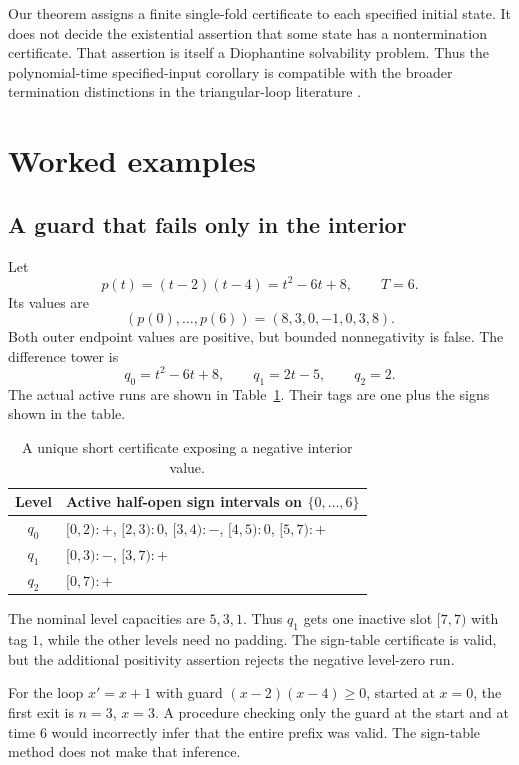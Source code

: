 \documentclass[11pt,a4paper]{article}
\theoremstyle{definition}
\theoremstyle{remark}
\newcommand{\srctag}[1]{\texorpdfstring{\hspace{0.5em}{\normalfont\small\color{accent}[#1]}}{ [#1]}}
\begin{document}
Our theorem assigns a finite single-fold certificate to each specified
initial state. It does not decide the existential assertion that some
state has a nontermination certificate. That assertion is itself a
Diophantine solvability problem. Thus the polynomial-time specified-input
corollary is compatible with the broader termination distinctions in the
triangular-loop literature \cite{hfg2024,lmg2024}.

\section{Worked examples\srctag{02}}
\label{cdc:pt:sec:examples}

\subsection{A guard that fails only in the interior}
Let
\[
 p(t)=(t-2)(t-4)=t^2-6t+8,\qquad T=6.
\]
Its values are
\[
 (p(0),\ldots,p(6))=(8,3,0,-1,0,3,8).
\]
Both outer endpoint values are positive, but bounded nonnegativity is
false. The difference tower is
\[
 q_0=t^2-6t+8,\qquad q_1=2t-5,\qquad q_2=2.
\]
The actual active runs are shown in Table~\ref{cdc:pt:tab:runs}. Their tags are
one plus the signs shown in the table.

\begin{table}[H]
\centering
\begin{tabular}{cl}
\toprule
Level & Active half-open sign intervals on $\{0,\ldots,6\}$\\
\midrule
$q_0$ & $[0,2):+$, $[2,3):0$, $[3,4):-$, $[4,5):0$, $[5,7):+$\\
$q_1$ & $[0,3):-$, $[3,7):+$\\
$q_2$ & $[0,7):+$\\
\bottomrule
\end{tabular}
\caption{A unique short certificate exposing a negative interior value.}
\label{cdc:pt:tab:runs}
\end{table}

The nominal level capacities are $5,3,1$. Thus $q_1$ gets one inactive
slot $[7,7)$ with tag $1$, while the other levels need no padding. The
sign-table certificate is valid, but the additional positivity assertion
rejects the negative level-zero run.

For the loop $x'=x+1$ with guard $(x-2)(x-4)\geq0$, started at $x=0$,
the first exit is $n=3$, $x=3$. A procedure checking only the guard at the
start and at time $6$ would incorrectly infer that the entire prefix was
valid. The sign-table method does not make that inference.
\end{document}
